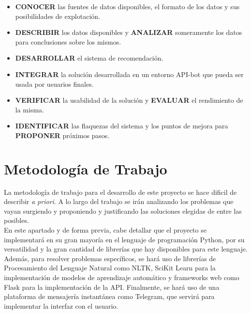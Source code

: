 \begin{itemize}
    \item \textbf{CONOCER} las fuentes de datos disponibles, el formato de los datos y sus posibilidades de explotación.
    \item \textbf{DESCRIBIR} los datos disponibles y \textbf{ANALIZAR} someramente los datos para conclusiones sobre los mismos.
    \item \textbf{DESARROLLAR} el sistema de recomendación.
    \item \textbf{INTEGRAR} la solución desarrollada en un entorno API-bot que pueda ser usada por usuarios finales.
    \item \textbf{VERIFICAR} la usabilidad de la solución y \textbf{EVALUAR} el rendimiento de la misma.
    \item \textbf{IDENTIFICAR} las flaquezas del sistema y los puntos de mejora para \textbf{PROPONER} próximos pasos.
\end{itemize}

\section{Metodología de Trabajo}\label{sec:metodología}

La metodología de trabajo para el desarrollo de este proyecto se hace dificil de describir \textit{a priori}. A lo largo del trabajo se irán analizando los problemas que vayan surgiendo y proponiendo y justificando las soluciones elegidas de entre las posibles.\\

En este apartado y de forma previa, cabe detallar que el proyecto se implementará en su gran mayoría en el lenguaje de programación Python, por su versatilidad y la gran cantidad de librerías que hay disponibles para este lenguaje. Además, para resolver problemas específicos, se hará uso de librerías de Procesamiento del Lenguaje Natural como NLTK, SciKit Learn para la implementación de modelos de aprendizaje automático y frameworks web como Flask para la implementación de la API. Finalmente, se hará uso de una plataforma de mensajería instantánea como Telegram, que servirá para implementar la interfaz con el usuario.